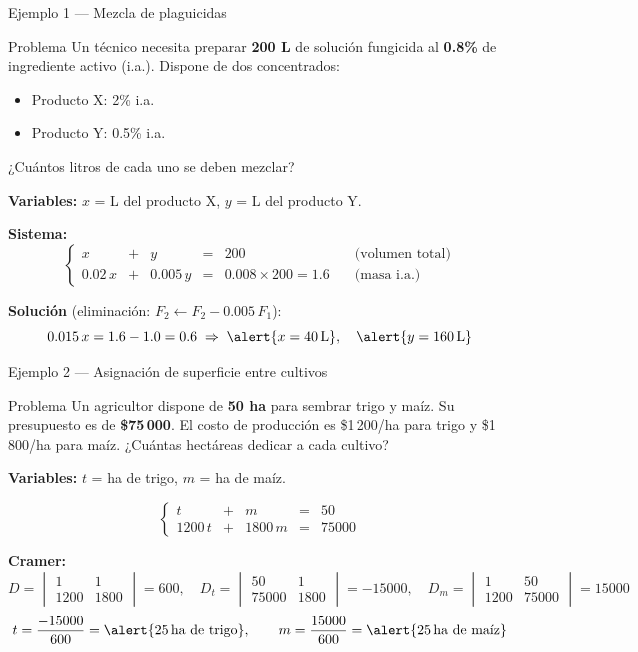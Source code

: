 \documentclass[11pt, aspectratio=169]{beamer}
\newcommand{\deter}[4]{\begin{vmatrix} #1 & #2 \\ #3 & #4 \end{vmatrix}}
\begin{document}
	\begin{frame}{Ejemplo 1 — Mezcla de plaguicidas}
		\begin{exampleblock}{Problema}
			Un técnico necesita preparar \textbf{200 L} de solución fungicida
			al \textbf{0.8\%} de ingrediente activo (i.a.).
			Dispone de dos concentrados:
			\begin{itemize}
				\item Producto X: 2\% i.a. \quad
				\item Producto Y: 0.5\% i.a.
			\end{itemize}
			¿Cuántos litros de cada uno se deben mezclar?
		\end{exampleblock}
		
		\pause
		\textbf{Variables:} $x$ = L del producto X, \; $y$ = L del producto Y.
		
		\pause
		\textbf{Sistema:}
		\[
		\left\{
		\begin{array}{rcrcrl}
			x & + & y & = & 200 & \quad\text{(volumen total)}\\[4pt]
			0.02\,x & + & 0.005\,y & = & 0.008 \times 200 = 1.6 & \quad\text{(masa i.a.)}
		\end{array}
		\right.
		\]
		
		\pause
		\textbf{Solución} (eliminación: $F_2 \leftarrow F_2 - 0.005\,F_1$):
		\[
		0.015\,x = 1.6 - 1.0 = 0.6
		\;\Rightarrow\; \alert{x = 40\,\text{L}}, \quad \alert{y = 160\,\text{L}}
		\]
	\end{frame}
	
	\begin{frame}{Ejemplo 2 — Asignación de superficie entre cultivos}
		\begin{exampleblock}{Problema}
			Un agricultor dispone de \textbf{50 ha} para sembrar trigo y maíz.
			Su presupuesto es de \textbf{\$75\,000}.
			El costo de producción es \$1\,200/ha para trigo y \$1\,800/ha para maíz.
			¿Cuántas hectáreas dedicar a cada cultivo?
		\end{exampleblock}
		
		\pause
		\textbf{Variables:} $t$ = ha de trigo, \; $m$ = ha de maíz.
		
		\[
		\left\{
		\begin{array}{rcrcr}
			t & + & m & = & 50 \\[4pt]
			1200\,t & + & 1800\,m & = & 75000
		\end{array}
		\right.
		\]
		
		\pause
		\textbf{Cramer:}
		\[
		D = \deter{1}{1}{1200}{1800} = 600, \quad
		D_t = \deter{50}{1}{75000}{1800} = -\!15000, \quad
		D_m = \deter{1}{50}{1200}{75000} = 15000
		\]
		\pause
		\[
		t = \frac{-15000}{600}= \alert{25\,\text{ha de trigo}}, \qquad
		m = \frac{15000}{600} = \alert{25\,\text{ha de maíz}}
		\]
	\end{frame}
	
\end{document}

